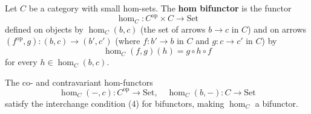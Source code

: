 Let $C$ be a category with small hom-sets. The \textbf{hom bifunctor} is the functor
$$\hom_C: C^{\text{op}} \times C \to \text{Set}$$
defined on objects by $\hom_C(b, c)$ (the set of arrows $b \to c$ in $C$) and on arrows $(f^{\text{op}}, g): (b, c) \to (b', c')$ (where $f: b' \to b$ in $C$ and $g: c \to c'$ in $C$) by
$$\hom_C(f, g)(h) = g \circ h \circ f$$
for every $h \in \hom_C(b, c)$.

The co- and contravariant hom-functors
$$\hom_C(-, c): C^{\text{op}} \to \text{Set}, \quad \hom_C(b, -): C \to \text{Set}$$
satisfy the interchange condition (4) for bifunctors, making $\hom_C$ a bifunctor.
